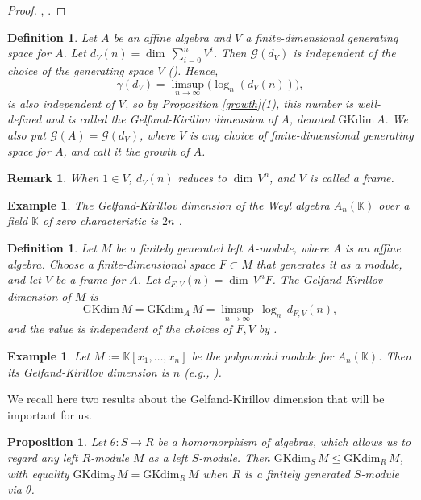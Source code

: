 \documentclass[10pt,a4paper]{amsart}
\newtheorem{proposition}[theorem]{Proposition}
\newtheorem{definition}[theorem]{Definition}
\newtheorem{remark}[theorem]{Remark}
\newtheorem{example}[theorem]{Example}
\newcommand{\Weyl}{A_n(\mathbb{K})} %
\newcommand{\GKdim}{\text{GKdim}}    %
\def\k{\mathbb K}
\def\k{\mathbb K}
\begin{document}
\begin{proof}
    \cite[Lemma 2.1b)]{KL}, \cite[Lemma 8.1.7]{McConnell}.
\end{proof}
\begin{definition}
Let $A$ be an affine algebra and $V$ a finite-dimensional generating space for $A$. Let $d_V(n)=\dim \, \sum_{i=0}^n V^i$. Then $\mathcal{G}(d_V)$ is independent of the choice of the generating space $V$ (\cite[Lemma 1.1]{KL}). Hence,
\[ \gamma(d_V)=\limsup_{n \rightarrow \infty} \big(\log_n(d_V(n))\big),\]
is also independent of $V$, so by Proposition \ref{growth}(1), this number is well-defined and is called the \emph{Gelfand-Kirillov dimension} of $A$, denoted $\GKdim \, A$. We also put $\mathcal{G}(A)=\mathcal{G}(d_V)$, where $V$ is any choice of finite-dimensional generating space for $A$, and call it \emph{the growth of} $A$.
\end{definition}
\begin{remark}
When $1 \in V$, $d_V(n)$ reduces to $\dim \, V^n$, and $V$ is called a frame.
\end{remark}
\begin{example}
The Gelfand-Kirillov dimension of the Weyl algebra $\Weyl$ over a field $\k$ of zero characteristic is $2n$ \cite[Proposition 8.1.15(ii)]{McConnell}.
\end{example}
\begin{definition}
    Let $M$ be a finitely generated left $A$-module, where $A$ is an affine algebra. Choose a finite-dimensional space $F \subset M$ that generates it as a module, and let $V$ be a frame for $A$. Let $d_{F,V}(n)=\dim \, V^n F$. The \emph{Gelfand-Kirillov dimension} of $M$ is
    \[ \GKdim \, M=\GKdim_A\, M=\limsup_{n \to \infty} \, \log_n \, d_{F,V}(n), \]
    and the value is independent of the choices of $F, V$ by \cite[Proof of Lemma 1.1]{KL}.
\end{definition}
\begin{example}
Let $M:=\k[x_1,\ldots,x_n]$ be the polynomial module for $\Weyl$. Then its Gelfand-Kirillov dimension is $n$ (e.g., \cite[Theorem 8.5.10]{McConnell}).
\end{example}
We recall here two results about the Gelfand-Kirillov dimension that will be important for us.
\begin{proposition}\label{basic-GK-1}
    Let $\theta: S \rightarrow R$ be a homomorphism of algebras, which allows us to regard any left $R$-module $M$ as a left $S$-module. Then $\GKdim_S \, M \leq \GKdim_R \,  M$, with equality $\GKdim_S \, M = \GKdim_R \,  M$ when $R$ is a finitely generated $S$-module via $\theta$. \end{proposition}
\end{document}

